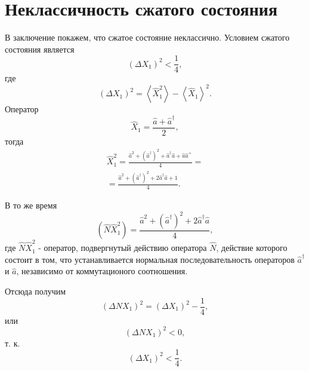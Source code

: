 \section{Неклассичность сжатого состояния}
В заключение покажем, что сжатое состояние неклассично. Условием
сжатого состояния является 
\begin{equation}
\left(\Delta X_1\right)^2 < \frac{1}{4},
\nonumber
\end{equation}
где 
\[
\left(\Delta X_1\right)^2 =
\left<\hat{X}_1^2\right> - 
\left<\hat{X}_1\right>^2.
\]
Оператор
\[
\hat{X}_1 = \frac{\hat{a} + \hat{a}^{\dag}}{2},
\]
тогда 
\begin{eqnarray}
\hat{X}_1^2 = \frac{\hat{a}^2 + \left(\hat{a}^{\dag}\right)^2 +
  \hat{a}^{\dag}\hat{a} + \hat{a} \hat{a}^{+}}{4} = 
\nonumber \\
=
\frac{\hat{a}^2 + \left(\hat{a}^{\dag}\right)^2 +
  2 \hat{a}^{\dag}\hat{a} + 1}{4}.
\nonumber
\end{eqnarray}

В то же время 
\[
\left(\hat{N}\hat{X}_1^2\right) = \frac{
\hat{a}^2 + \left(\hat{a}^{\dag}\right)^2 +
2 \hat{a}^{\dag}\hat{a}}{4},
\]
где $\hat{N}\hat{X}_1^2$ - оператор, подвергнутый действию оператора
$\hat{N}$, действие которого состоит в том, что устанавливается
нормальная последовательность операторов $\hat{a}^{\dag}$ и $\hat{a}$,
независимо от коммутационого соотношения.

Отсюда получим
\begin{equation}
\left(\Delta N X_1\right)^2 = 
\left(\Delta X_1\right)^2 - \frac{1}{4},
\nonumber
\end{equation}
или
\begin{equation}
\left(\Delta N X_1\right)^2 < 0,
\nonumber
\end{equation}
т. к. 
\[
\left(\Delta X_1\right)^2 < \frac{1}{4}.
\]

